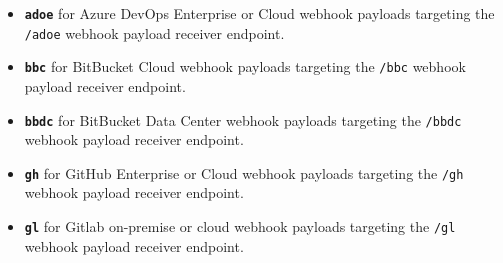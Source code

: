 \begin{itemize}
    \item \textbf{\texttt{adoe}} for Azure DevOps Enterprise or Cloud webhook payloads targeting the \texttt{/adoe}
    webhook payload receiver endpoint.
    \item \textbf{\texttt{bbc}} for BitBucket Cloud webhook payloads targeting the \texttt{/bbc}
    webhook payload receiver endpoint.
    \item \textbf{\texttt{bbdc}} for BitBucket Data Center webhook payloads targeting the \texttt{/bbdc}
    webhook payload receiver endpoint.
    \item \textbf{\texttt{gh}} for GitHub Enterprise or Cloud webhook payloads targeting the \texttt{/gh}
    webhook payload receiver endpoint.
    \item \textbf{\texttt{gl}} for Gitlab on-premise or cloud webhook payloads targeting the \texttt{/gl}
    webhook payload receiver endpoint.
\end{itemize}

